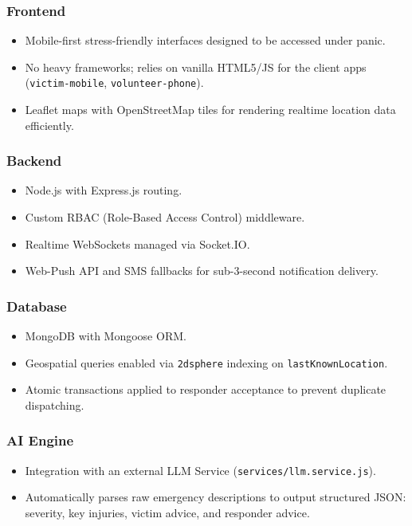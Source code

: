 \documentclass[12pt,a4paper]{article}
\begin{document}
\subsubsection*{Frontend}
\begin{itemize}[leftmargin=2em]
  \item Mobile-first stress-friendly interfaces designed to be accessed under panic.
  \item No heavy frameworks; relies on vanilla HTML5/JS for the client apps (\texttt{victim-mobile}, \texttt{volunteer-phone}).
  \item Leaflet maps with OpenStreetMap tiles for rendering realtime location data efficiently.
\end{itemize}

\subsubsection*{Backend}
\begin{itemize}[leftmargin=2em]
  \item Node.js with Express.js routing.
  \item Custom RBAC (Role-Based Access Control) middleware.
  \item Realtime WebSockets managed via Socket.IO.
  \item Web-Push API and SMS fallbacks for sub-3-second notification delivery.
\end{itemize}

\subsubsection*{Database}
\begin{itemize}[leftmargin=2em]
  \item MongoDB with Mongoose ORM.
  \item Geospatial queries enabled via \texttt{2dsphere} indexing on \texttt{lastKnownLocation}.
  \item Atomic transactions applied to responder acceptance to prevent duplicate dispatching.
\end{itemize}

\subsubsection*{AI Engine}
\begin{itemize}[leftmargin=2em]
  \item Integration with an external LLM Service (\texttt{services/llm.service.js}).
  \item Automatically parses raw emergency descriptions to output structured JSON: severity, key injuries, victim advice, and responder advice.
\end{itemize}
\end{document}
